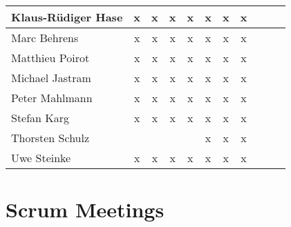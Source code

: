 \documentclass[a4paper, 11pt]{article}
\begin{document}
\begin{tabular}{|l|c|c|c|c|c|c|c|c|c|c|}
Klaus-R\"udiger Hase & x & x & x & x & x & x & x \\\hline
Marc Behrens         & x & x & x & x & x & x & x  \\\hline
Matthieu Poirot       & x & x & x & x & x & x & x  \\\hline
Michael Jastram       & x & x & x & x & x & x & x  \\\hline
Peter Mahlmann        & x & x & x & x & x & x & x \\\hline
Stefan Karg          & x  & x & x  & x & x & x & x \\\hline
Thorsten Schulz      &   &   &  &  & x & x & x \\\hline
Uwe Steinke          & x & x & x & x & x & x & x \\\hline
\end{tabular}


\section{Scrum Meetings}
\end{document}

